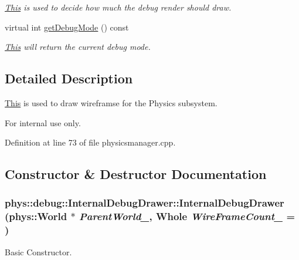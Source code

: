 \begin{DoxyCompactItemize}
\begin{DoxyCompactList}\small\item\em \hyperlink{structThis}{This} is used to decide how much the debug render should draw. \item\end{DoxyCompactList}\item 
virtual int \hyperlink{classphys_1_1debug_1_1InternalDebugDrawer_aba329861569d741e970ce5aafb668e84}{getDebugMode} () const 
\begin{DoxyCompactList}\small\item\em \hyperlink{structThis}{This} will return the current debug mode. \item\end{DoxyCompactList}\end{DoxyCompactItemize}


\subsection{Detailed Description}
\hyperlink{structThis}{This} is used to draw wireframse for the Physics subsystem. \begin{DoxyInternal}{For internal use only.}
\end{DoxyInternal}


Definition at line 73 of file physicsmanager.cpp.



\subsection{Constructor \& Destructor Documentation}
\hypertarget{classphys_1_1debug_1_1InternalDebugDrawer_a0e701e00e1080fdadfcf35e9051789a3}{
\subsubsection[{InternalDebugDrawer}]{\setlength{\rightskip}{0pt plus 5cm}phys::debug::InternalDebugDrawer::InternalDebugDrawer ({\bf phys::World} $\ast$ {\em ParentWorld\_\-}, \/  {\bf Whole} {\em WireFrameCount\_\-} = {})}}
\label{db/d27/classphys_1_1debug_1_1InternalDebugDrawer_a0e701e00e1080fdadfcf35e9051789a3}


Basic Constructor. 

